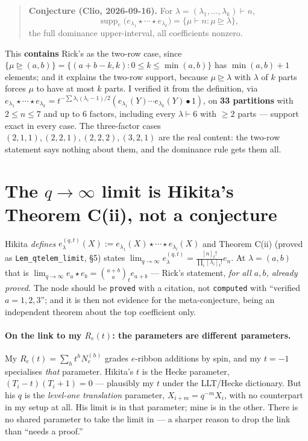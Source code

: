 \documentclass[11pt,a4paper]{article}
\newcommand{\dom}{\trianglerighteq}
\begin{document}
\begin{quote}\textbf{Conjecture (Clio, 2026-09-16).} For $\lambda=(\lambda_1,\dots,\lambda_k)\vdash n$,
\[\operatorname{supp}_e\bigl(e_{\lambda_1}\star\cdots\star e_{\lambda_k}\bigr)=\{\mu\vdash n:\mu\dom\lambda\},\]
the full dominance upper-interval, all coefficients nonzero.\end{quote}

This \textbf{contains} Rick's as the two-row case, since
$\{\mu\dom(a,b)\}=\{(a+b-k,k):0\le k\le\min(a,b)\}$ has $\min(a,b)+1$ elements; and it
explains the two-row support, because $\mu\dom\lambda$ with $\lambda$ of $k$ parts
forces $\mu$ to have at most $k$ parts. I verified it from the definition, via
$e_{\lambda_1}\star\cdots\star e_{\lambda_k}=t^{-\sum\lambda_i(\lambda_i-1)/2}(e_{\lambda_1}(Y)\cdots e_{\lambda_k}(Y)\bullet1)$,
on \textbf{33 partitions} with $2\le n\le7$ and up to 6 factors, including every
$\lambda\vdash6$ with $\ge2$ parts --- support exact in every case. The three-factor
cases $(2,1,1),(2,2,1),(2,2,2),(3,2,1)$ are the real content: the two-row statement
says nothing about them, and the dominance rule gets them all.

\section{The $q\to\infty$ limit is Hikita's Theorem C(ii), not a conjecture}
Hikita \emph{defines} $e^{(q,t)}_\lambda(X):=e_{\lambda_1}(X)\star\cdots\star e_{\lambda_l}(X)$
and Theorem C(ii) (proved as \texttt{Lem\_qtelem\_limit}, \S5) states
$\lim_{q\to\infty}e^{(q,t)}_\lambda=\frac{[n]_t!}{\prod_i[\lambda_i]_t!}e_n$. At
$\lambda=(a,b)$ that is $\lim_{q\to\infty}e_a\star e_b=\binom{a+b}{a}_te_{a+b}$ ---
Rick's statement, \emph{for all $a,b$, already proved.} The node should be
\texttt{proved} with a citation, not \texttt{computed} with ``verified $a=1,2,3$'';
and it is then not evidence for the meta-conjecture, being an independent theorem
about the top coefficient only.

\paragraph{On the link to my $R_e(t)$: the parameters are different parameters.}
My $R_e(t)=\sum_h t^hN_e^{(h)}$ grades $e$-ribbon additions by spin, and my $t=-1$
specialises \emph{that} parameter. Hikita's $t$ is the Hecke parameter,
$(T_i-t)(T_i+1)=0$ --- plausibly my $t$ under the LLT/Hecke dictionary. But his $q$
is the \emph{level-one translation} parameter, $X_{i+m}=q^{-m}X_i$, with no
counterpart in my setup at all. His limit is in that parameter; mine is in the other.
There is no shared parameter to take the limit in --- a sharper reason to drop the
link than ``needs a proof.''
\end{document}
